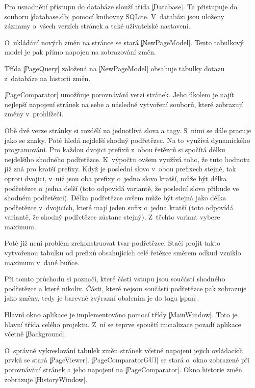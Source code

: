 Pro usnadnění přístupu do databáze slouží třída \c|Database|.
Ta přistupuje do souboru \c|database.db| %
pomocí knihovny SQLite.
V~databázi jsou uloženy záznamy o~všech verzích stránek a také uživatelské nastavení.

O~ukládání nových změn na stránce se stará \c|NewPageModel|. Tento tabulkový model je pak přímo napojen na zobrazování změn.

Třída \c|PageQuery| založená na \c|NewPageModel| obsahuje tabulky dotazu z~databáze na historii změn.

\c|PageComparator| umožňuje porovnávání verzí stránek.
Jeho úkolem je najít nejlepší napojení stránek na sebe a následné vytvoření souborů, které zobrazují změny v~prohlížeči.

Obě dvě verze stránky si rozdělí na jednotlivá slova a tagy. S~nimi se dále pracuje jako se znaky.
Poté hledá nejdelší shodný podřetězec.
Na to využívá dynamického programování.
Pro každou dvojici prefixů z~obou řetězců si spočítá délku nejdelšího shodného podřetězce.
K~výpočtu ovšem využívá toho, že tuto hodnotu již zná pro kratší prefixy.
Když je poslední slovo v~obou prefixech stejné, tak oproti dvojici, v~niž jsou oba prefixy o~jedno slovo kratší, může být délka podřetězce o~jedna delší (toto odpovídá variantě, že poslední slovo přibude ve shodném podřetězci).
Délka podřetězce ovšem může být stejná jako délka podřetězce v~dvojicích, které mají jeden sufix o~jedna kratší (toto odpovídá variantě, že shodný podřetězec zůstane stejný).
Z~těchto variant vybere maximum.

Poté již není problém zrekonstruovat tvar podřetězce.
Stačí projít takto vytvořenou tabulku od prefixů obsahujících celé řetězce směrem odkud vzniklo maximum v~dané buňce.

Při tomto průchodu si poznačí, které části vstupu jsou součástí shodného podřetězce a které nikoliv.
Části, které nejsou součástí podřetězce pak zobrazuje jako změny, tedy je barevně zvýrazní obalením je do tagu \c|span|.




Hlavní okno aplikace je implementováno pomocí třídy \c|MainWindow|. Toto je hlavní třída celého projektu.
Z~ní se teprve spouští inicializace pozadí aplikace včetně \c|Background|.

O~správné vykreslování tabulek změn stránek včetně napojení jejich ovládacích prvků se stará \c|PageViewer|.
\c|PageComparatorGUI| se stará o~okno zobrazené při porovnávání stránek a jeho napojení na \c|PageComparator|.
Okno historie změn zobrazuje \c|HistoryWindow|.

